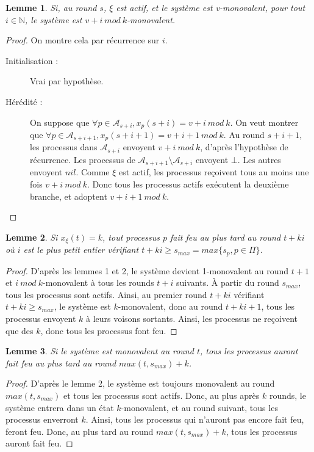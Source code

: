 \documentclass{article}
\newtheorem{lemma}{Lemme}
\begin{document}
\begin{lemma}
	Si, au round $s$, $\xi$ est actif, et le système est v-monovalent, pour tout $i \in \mathds{N}$, le système est $v+i~mod~k$-monovalent.
\end{lemma}
\begin{proof}
	On montre cela par récurrence sur $i$.
	\begin{description}
		\item[Initialisation :] Vrai par hypothèse.
		\item[Hérédité :] On suppose que $\forall p \in \mathcal{A}_{s+i}, x_p(s+i) = v+i~mod~k$.
			On veut montrer que $\forall p \in \mathcal{A}_{s+i+1}, x_p(s+i+1) = v+i+1~mod~k$.
			Au round $s+i+1$, les processus dans $\mathcal{A}_{s+i}$ envoyent $v+i~mod~k$, d'après l'hypothèse de récurrence.
			Les processus de $\mathcal{A}_{s+i+1} \setminus \mathcal{A}_{s+i}$ envoyent $\bot$. Les autres envoyent $nil$.
			Comme $\xi$ est actif, les processus reçoivent tous au moins une fois $v+i~mod~k$. Donc tous les processus actifs exécutent la deuxième branche, et adoptent $v+i+1~mod~k$.
	\end{description}
\end{proof}

\begin{lemma}
	Si $x_\xi(t) = k$, tout processus $p$ fait feu au plus tard au round $t+k i$ où $i$ est le plus petit entier vérifiant $t+k i \geq s_{max} = max \{s_p, p \in \Pi\}$.
\end{lemma}
\begin{proof}
	D'après les lemmes 1 et 2, le système devient 1-monovalent au round $t+1$ et $i~mod~k$-monovalent à tous les rounds $t+i$ suivants.
	À partir du round $s_{max}$, tous les processus sont actifs.
	Ainsi, au premier round $t+k i$ vérifiant $t+k i \geq s_{max}$, le système est $k$-monovalent, donc au round $t+k i +1$, tous les processus envoyent $k$ à leurs voisons sortants.
	Ainsi, les processus ne reçoivent que des $k$, donc tous les processus font feu.
\end{proof}

\begin{lemma}
	Si le système est monovalent au round $t$, tous les processus auront fait feu au plus tard au round $max(t, s_{max})+k$.
\end{lemma}
\begin{proof}
	D'après le lemme 2, le système est toujours monovalent au round $max(t, s_{max})$ et tous les processus sont actifs.
	Donc, au plus après $k$ rounds, le système entrera dans un état $k$-monovalent, et au round suivant, tous les processus enverront $k$.
	Ainsi, tous les processus qui n'auront pas encore fait feu, feront feu.
	Donc, au plus tard au round $max(t, s_{max})+k$, tous les processus auront fait feu.
\end{proof}
\end{document}
